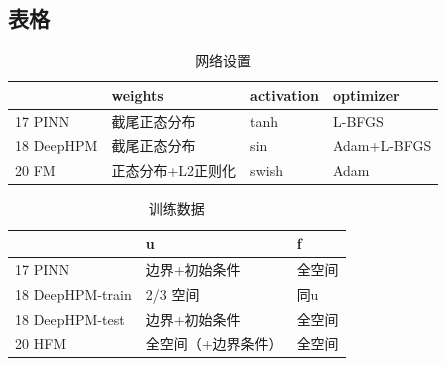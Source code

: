 \subsection{表格}
\begin{frame}

	\begin{table}
		\caption{网络设置}	
		\centering %
		\begin{tabular}{|l|l|l|l|}
			\hline                            & \textbf{weights}           & \textbf{activation} & \textbf{optimizer}   \\	
			\hline 17 PINN                    & 截尾正态分布      & tanh       & L-BFGS     \\
			\hline 18  DeepHPM				 & 截尾正态分布      & sin        & Adam+L-BFGS \\
			\hline 20 FM                     & 正态分布+L2正则化 & swish      & Adam        \\
			\hline			
		\end{tabular}

	\end{table}

	\begin{table}	
		\caption{训练数据}

		\begin{tabular}{|l|l|l|}	
			\hline                          &   u                   & f      \\
			\hline 17 PINN                   & 边界+初始条件       & 全空间 \\
			\hline 18  DeepHPM-train 		 & 2/3 空间          & 同u    \\
			\hline 18 DeepHPM-test             & 边界+初始条件       & 全空间 \\
			\hline 20 HFM                     & 全空间（+边界条件） & 全空间 \\	
			\hline
		\end{tabular}

	\end{table}	
\end{frame}

